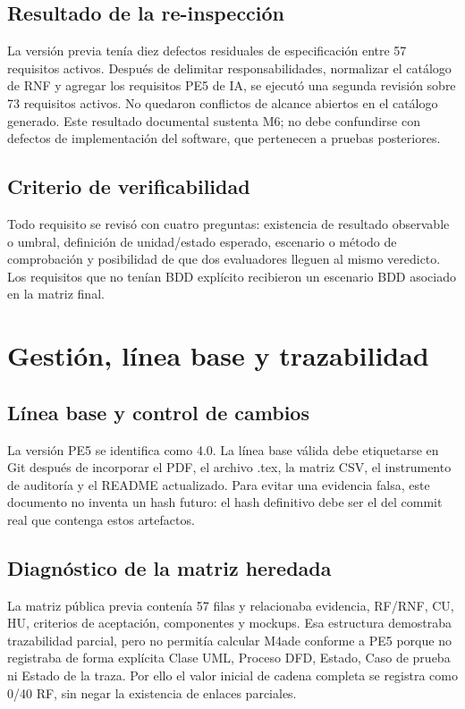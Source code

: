 \documentclass[11pt,a4paper]{article}
\begin{document}
\subsection{Resultado de la re-inspección}
La versión previa tenía diez defectos residuales de especificación entre 57 requisitos activos. Después de delimitar responsabilidades, normalizar el catálogo de RNF y agregar los requisitos PE5 de IA, se ejecutó una segunda revisión sobre 73 requisitos activos. No quedaron conflictos de alcance abiertos en el catálogo generado. Este resultado documental sustenta M6; no debe confundirse con defectos de implementación del software, que pertenecen a pruebas posteriores.

\subsection{Criterio de verificabilidad}
Todo requisito se revisó con cuatro preguntas: existencia de resultado observable o umbral, definición de unidad/estado esperado, escenario o método de comprobación y posibilidad de que dos evaluadores lleguen al mismo veredicto. Los requisitos que no tenían BDD explícito recibieron un escenario BDD asociado en la matriz final.
\clearpage
\section{Gestión, línea base y trazabilidad}
\subsection{Línea base y control de cambios}
La versión PE5 se identifica como 4.0. La línea base válida debe etiquetarse en Git después de incorporar el PDF, el archivo .tex, la matriz CSV, el instrumento de auditoría y el README actualizado. Para evitar una evidencia falsa, este documento no inventa un hash futuro: el hash definitivo debe ser el del commit real que contenga estos artefactos.

\subsection{Diagnóstico de la matriz heredada}
La matriz pública previa contenía 57 filas y relacionaba evidencia, RF/RNF, CU, HU, criterios de aceptación, componentes y mockups. Esa estructura demostraba trazabilidad parcial, pero no permitía calcular M4ade conforme a PE5 porque no registraba de forma explícita Clase UML, Proceso DFD, Estado, Caso de prueba ni Estado de la traza. Por ello el valor inicial de cadena completa se registra como 0/40 RF, sin negar la existencia de enlaces parciales.
\end{document}
